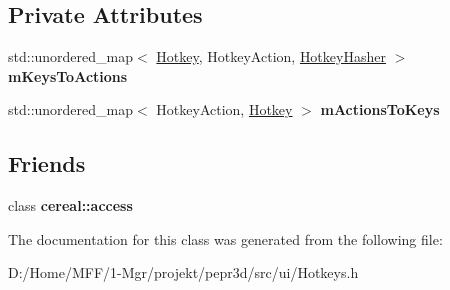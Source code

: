 \subsection*{Private Attributes}
\begin{DoxyCompactItemize}
\item 
\mbox{\label{classpepr3d_1_1_hotkeys_ace32a0c35b2c80135b45460dca1fd313}} 
std\+::unordered\+\_\+map$<$ \mbox{\hyperlink{structpepr3d_1_1_hotkey}{Hotkey}}, Hotkey\+Action, \mbox{\hyperlink{structpepr3d_1_1_hotkey_hasher}{Hotkey\+Hasher}} $>$ {\bfseries m\+Keys\+To\+Actions}
\item 
\mbox{\label{classpepr3d_1_1_hotkeys_afd769fcf12839dafab79c6d4da780412}} 
std\+::unordered\+\_\+map$<$ Hotkey\+Action, \mbox{\hyperlink{structpepr3d_1_1_hotkey}{Hotkey}} $>$ {\bfseries m\+Actions\+To\+Keys}
\end{DoxyCompactItemize}
\subsection*{Friends}
\begin{DoxyCompactItemize}
\item 
\mbox{\label{classpepr3d_1_1_hotkeys_ab2f44cbb59a08132f4c843e5225bba0e}} 
class {\bfseries cereal\+::access}
\end{DoxyCompactItemize}


The documentation for this class was generated from the following file\+:\begin{DoxyCompactItemize}
\item 
D\+:/\+Home/\+M\+F\+F/1-\/\+Mgr/projekt/pepr3d/src/ui/Hotkeys.\+h\end{DoxyCompactItemize}
